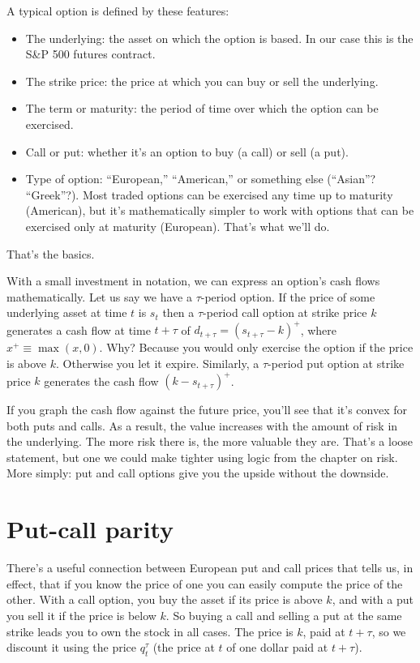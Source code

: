 \documentclass[11pt]{article}
\begin{document}
A typical option is defined by these features:
\begin{itemize}
\item The underlying:  the asset on which the option is based.
In our case this is the S\&P 500 futures contract.
\item The strike price: the price at which you can buy or sell
the underlying.
\item The term or maturity: the period of time
over which the option can be exercised.
\item Call or put:  whether it's an option to buy (a call) or sell (a put).
\item Type of option:  ``European,'' ``American,'' or something else (``Asian''?  ``Greek''?).
Most traded options can be exercised any time up to maturity (American),
but it's mathematically simpler to work with options that can be
exercised only at maturity (European).
That's what we'll do.
\end{itemize}
That's the basics.

With a small investment in notation,
we can express an option's cash flows mathematically.
Let us say we have a $\tau$-period option.
If the price of some underlying asset at time $t$ is $s_t$
then a $\tau$-period call option at strike price $k$
generates a cash flow at time $t+\tau$ of
$ d_{t + \tau} = ( s_{t+\tau} - k )^+ $,
where $x^+ \equiv \max(x,0) $.
Why?  Because you would only exercise the option if the price is above $k$.
Otherwise you let it expire.
Similarly, a $\tau$-period put option at strike price $k$
generates the cash flow $ (k - s_{t+\tau} )^+ $.

If you graph the cash flow against the future price, you'll see
that it's convex for both puts and calls.
As a result, the value increases with the amount
of risk in the underlying.
The more risk there is, the more valuable they are.
That's a loose statement, but one we could make tighter using  logic
from the chapter on risk.
More simply:  put and call options give you the upside
without the downside.


\section{Put-call parity}


There's a useful connection between European put and call prices
that tells us, in effect, that if you know the price of one you can
easily compute the price of the other.
With a call option, you buy the asset if its price is above $k$,
and with a put you sell it if the price is below $k$.
So buying a call and selling a put at the same strike leads you to own the stock in all cases.
The price is $k$, paid at $t+\tau$, so we discount it using
the price $q^\tau_t$ (the price at $t$ of one dollar paid at $t+\tau$).
\end{document}
